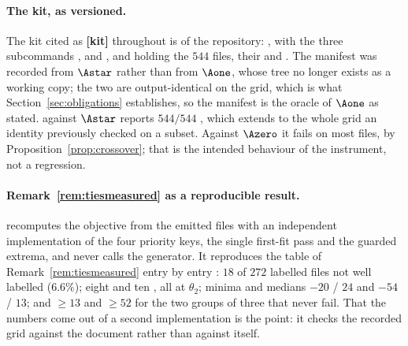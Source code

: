 
\paragraph{The kit, as versioned.} The kit cited as \textbf{[kit]} throughout is
 of the repository: ,  with the
three subcommands ,  and , and  holding
the $544$ files, their  and . The manifest
was recorded from $\Astar$ rather than from $\Aone$, whose tree no longer exists as a working
copy; the two are output-identical on the grid, which is what
Section~\ref{sec:obligations} establishes, so the manifest is the oracle of $\Aone$ as stated.
 against $\Astar$ reports $544/544$ , which extends to the
whole grid an identity previously checked on a subset. Against $\Azero$ it fails on most
files, by Proposition~\ref{prop:crossover}; that is the intended behaviour of the instrument,
not a regression.

\paragraph{Remark~\ref{rem:tiesmeasured} as a reproducible result.} 
recomputes the objective from the emitted files with an independent implementation of the four
priority keys, the single first-fit pass and the guarded extrema, and never calls the
generator. It reproduces the table of Remark~\ref{rem:tiesmeasured} entry by entry :
$18$ of $272$ labelled files not well labelled ($6.6\%$); eight  and ten
, all at $\theta_2$; minima and medians $-20$ / $24$ and
$-54$ / $13$; and $\ge13$ and $\ge52$ for the two groups of three that never fail. That the
numbers come out of a second implementation is the point: it checks the recorded grid against
the document rather than against itself.



